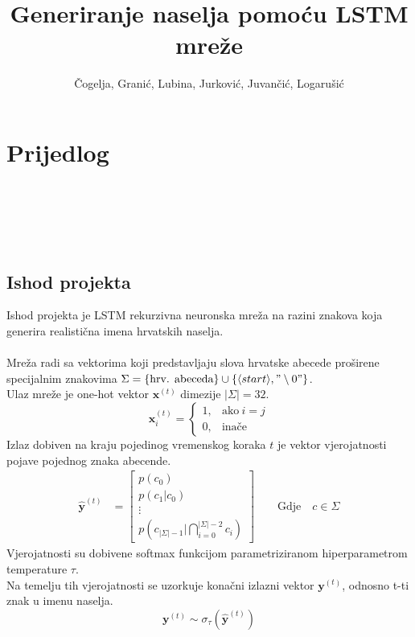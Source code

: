 \documentclass{report}
\title{Generiranje naselja pomoću LSTM mreže}
\author{Čogelja, Granić, Lubina, Jurković, Juvančić, Logarušić}
\begin{document}
\maketitle

\chapter*{Prijedlog}
\ \\
\\
\\
\\

\section{Ishod projekta}
Ishod projekta je LSTM rekurzivna neuronska mreža na razini znakova koja generira realistična imena hrvatskih naselja.\\
\\
Mreža radi sa vektorima koji predstavljaju slova hrvatske abecede proširene specijalnim znakovima $\Sigma = \{ \text{hrv. abeceda}\} \cup \{\langle start \rangle, "\setminus 0"\}$.\\
Ulaz mreže je one-hot vektor $\mathbf{x}^{(t)}$ dimezije $\lvert \Sigma \rvert = 32$.
\begin{equation}
\mathbf{x}^{(t)}_i=
    \begin{cases}
      1, & \text{ako}\ i=j \\
      0, & \text{inače}
    \end{cases}
\end{equation}
Izlaz dobiven na kraju pojedinog vremenskog koraka $t$ je vektor vjerojatnosti pojave pojednog znaka abecende.\\
\begin{align}
    \hat{\mathbf{y}}^{(t)} &= \begin{bmatrix}
           p(c_0) \\
           p(c_1 | c_0) \\
           \vdots \\
           p(c_{\lvert \Sigma \rvert -1} | \bigcap_{i=0}^{\lvert \Sigma \rvert -2} c_i)
         \end{bmatrix}
         \quad \quad \text{Gdje} \quad c \in \Sigma
\end{align}
Vjerojatnosti su dobivene softmax funkcijom parametriziranom hiperparametrom temperature $\tau$.\\
Na temelju tih vjerojatnosti se uzorkuje konačni izlazni vektor $\mathbf{y}^{(t)}$, odnosno t-ti znak u imenu naselja.\\
\begin{equation}
 \mathbf{y}^{(t)} \sim \sigma_{\tau}(\hat{\mathbf{y}}^{(t)})
\end{equation}
\end{document}
